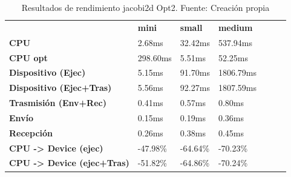 \begin{table}[H]
    \centering
    \begin{tabular}{lllllll}
    \rowcolor[HTML]{DAE8FC} \ &  \textbf{mini} &  \textbf{	small} &  \textbf{	medium} \\
    \cellcolor[HTML]{DAE8FC} \textbf{CPU} & 2.68ms & 	32.42ms & 	537.94ms \\
    \rowcolor[HTML]{EFEFEF} \cellcolor[HTML]{DAE8FC} \textbf{CPU opt} & 298.60ms & 	5.51ms & 	52.25ms \\
    \cellcolor[HTML]{DAE8FC} \textbf{Dispositivo (Ejec)} & 5.15ms & 	91.70ms & 	1806.79ms \\
    \rowcolor[HTML]{EFEFEF} \cellcolor[HTML]{DAE8FC} \textbf{Dispositivo (Ejec+Tras)} & 5.56ms & 	92.27ms & 	1807.59ms \\
    \cellcolor[HTML]{DAE8FC} \textbf{Trasmisión (Env+Rec)} & 0.41ms & 	0.57ms & 	0.80ms \\
    \rowcolor[HTML]{EFEFEF} \cellcolor[HTML]{DAE8FC} \textbf{Envío} & 0.15ms & 	0.19ms & 	0.36ms \\
    \cellcolor[HTML]{DAE8FC} \textbf{Recepción} & 0.26ms & 	0.38ms & 	0.45ms \\
    \rowcolor[HTML]{EFEFEF} \cellcolor[HTML]{DAE8FC} \textbf{CPU -> Device (ejec)} & -47.98\% & 	-64.64\% & 	-70.23\% \\
    \cellcolor[HTML]{DAE8FC} \textbf{CPU -> Device (ejec+Tras)} & -51.82\% & 	-64.86\% & 	-70.24\% \\
    \end{tabular}
    \caption[Resultados de rendimiento jacobi2d Opt2]{{Resultados de rendimiento jacobi2d Opt2. Fuente: Creación propia}}
    \label{table_test_jacobi2d_Opt2_hw_performanceResults}
\end{table}